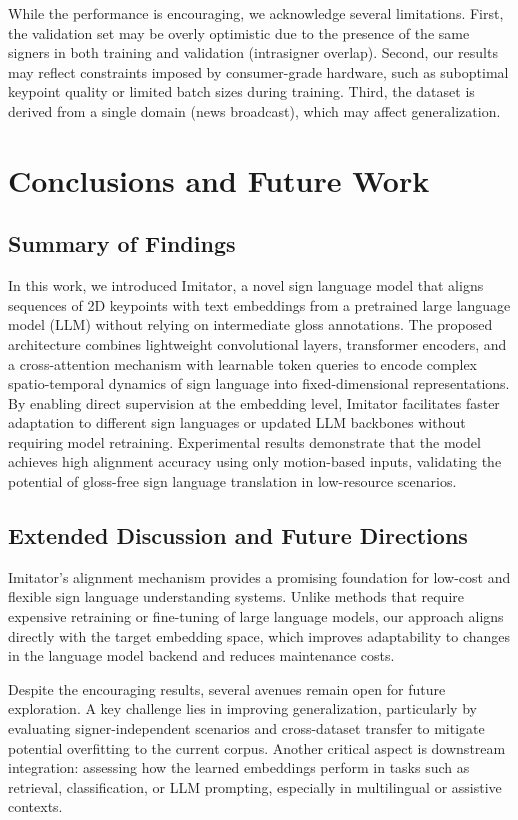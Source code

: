 \documentclass[runningheads]{llncs}
\begin{document}
While the performance is encouraging, we acknowledge several limitations. First, the validation set may be overly optimistic due to the presence of the same signers in both training and validation (intrasigner overlap). Second, our results may reflect constraints imposed by consumer-grade hardware, such as suboptimal keypoint quality or limited batch sizes during training. Third, the dataset is derived from a single domain (news broadcast), which may affect generalization.

\section{Conclusions and Future Work}

\subsection{Summary of Findings}

In this work, we introduced Imitator, a novel sign language model that aligns sequences of 2D keypoints with text embeddings from a pretrained large language model (LLM) without relying on intermediate gloss annotations. The proposed architecture combines lightweight convolutional layers, transformer encoders, and a cross-attention mechanism with learnable token queries to encode complex spatio-temporal dynamics of sign language into fixed-dimensional representations. By enabling direct supervision at the embedding level, Imitator facilitates faster adaptation to different sign languages or updated LLM backbones without requiring model retraining. Experimental results demonstrate that the model achieves high alignment accuracy using only motion-based inputs, validating the potential of gloss-free sign language translation in low-resource scenarios.
\subsection{Extended Discussion and Future Directions}

Imitator's alignment mechanism provides a promising foundation for low-cost and flexible sign language understanding systems. Unlike methods that require expensive retraining or fine-tuning of large language models, our approach aligns directly with the target embedding space, which improves adaptability to changes in the language model backend and reduces maintenance costs.

Despite the encouraging results, several avenues remain open for future exploration. A key challenge lies in improving generalization, particularly by evaluating signer-independent scenarios and cross-dataset transfer to mitigate potential overfitting to the current corpus. Another critical aspect is downstream integration: assessing how the learned embeddings perform in tasks such as retrieval, classification, or LLM prompting, especially in multilingual or assistive contexts.
\end{document}
